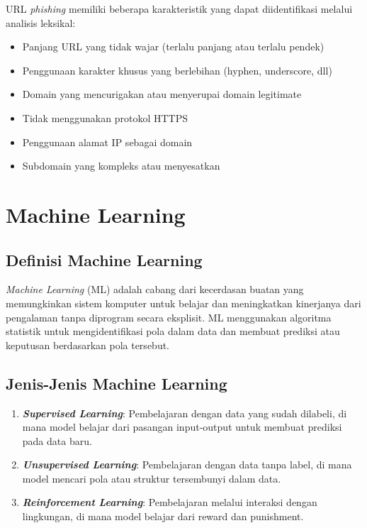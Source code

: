 URL \textit{phishing} memiliki beberapa karakteristik yang dapat diidentifikasi melalui analisis leksikal:

\begin{itemize}
    \item Panjang URL yang tidak wajar (terlalu panjang atau terlalu pendek)
    \item Penggunaan karakter khusus yang berlebihan (hyphen, underscore, dll)
    \item Domain yang mencurigakan atau menyerupai domain legitimate
    \item Tidak menggunakan protokol HTTPS
    \item Penggunaan alamat IP sebagai domain
    \item Subdomain yang kompleks atau menyesatkan
\end{itemize}

\section{Machine Learning}

\subsection{Definisi Machine Learning}

\textit{Machine Learning} (ML) adalah cabang dari kecerdasan buatan yang memungkinkan sistem komputer untuk belajar dan meningkatkan kinerjanya dari pengalaman tanpa diprogram secara eksplisit. ML menggunakan algoritma statistik untuk mengidentifikasi pola dalam data dan membuat prediksi atau keputusan berdasarkan pola tersebut.

\subsection{Jenis-Jenis Machine Learning}

\begin{enumerate}
    \item \textbf{\textit{Supervised Learning}}: Pembelajaran dengan data yang sudah dilabeli, di mana model belajar dari pasangan input-output untuk membuat prediksi pada data baru.
    
    \item \textbf{\textit{Unsupervised Learning}}: Pembelajaran dengan data tanpa label, di mana model mencari pola atau struktur tersembunyi dalam data.
    
    \item \textbf{\textit{Reinforcement Learning}}: Pembelajaran melalui interaksi dengan lingkungan, di mana model belajar dari reward dan punishment.
\end{enumerate}

